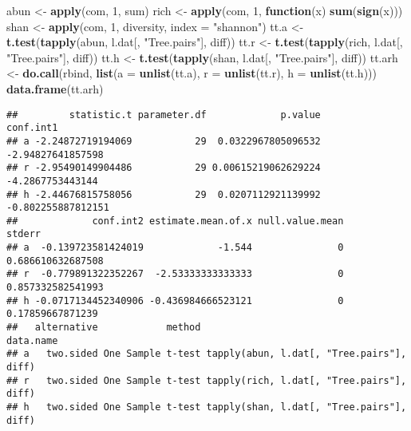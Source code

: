 \documentclass[]{article}
\newenvironment{Shaded}{\begin{snugshade}}{\end{snugshade}}
\newcommand{\KeywordTok}[1]{\textcolor[rgb]{0.13,0.29,0.53}{\textbf{#1}}}
\newcommand{\DataTypeTok}[1]{\textcolor[rgb]{0.13,0.29,0.53}{#1}}
\newcommand{\DecValTok}[1]{\textcolor[rgb]{0.00,0.00,0.81}{#1}}
\newcommand{\StringTok}[1]{\textcolor[rgb]{0.31,0.60,0.02}{#1}}
\newcommand{\ControlFlowTok}[1]{\textcolor[rgb]{0.13,0.29,0.53}{\textbf{#1}}}
\newcommand{\NormalTok}[1]{#1}
\begin{document}
\begin{Shaded}
\begin{Highlighting}[]
\NormalTok{abun <-}\StringTok{ }\KeywordTok{apply}\NormalTok{(com, }\DecValTok{1}\NormalTok{, sum)}
\NormalTok{rich <-}\StringTok{ }\KeywordTok{apply}\NormalTok{(com, }\DecValTok{1}\NormalTok{, }\ControlFlowTok{function}\NormalTok{(x) }\KeywordTok{sum}\NormalTok{(}\KeywordTok{sign}\NormalTok{(x)))}
\NormalTok{shan <-}\StringTok{ }\KeywordTok{apply}\NormalTok{(com, }\DecValTok{1}\NormalTok{, diversity, }\DataTypeTok{index =} \StringTok{"shannon"}\NormalTok{)}
\NormalTok{tt.a <-}\StringTok{ }\KeywordTok{t.test}\NormalTok{(}\KeywordTok{tapply}\NormalTok{(abun, l.dat[, }\StringTok{"Tree.pairs"}\NormalTok{], diff))}
\NormalTok{tt.r <-}\StringTok{ }\KeywordTok{t.test}\NormalTok{(}\KeywordTok{tapply}\NormalTok{(rich, l.dat[, }\StringTok{"Tree.pairs"}\NormalTok{], diff))}
\NormalTok{tt.h <-}\StringTok{ }\KeywordTok{t.test}\NormalTok{(}\KeywordTok{tapply}\NormalTok{(shan, l.dat[, }\StringTok{"Tree.pairs"}\NormalTok{], diff))}
\NormalTok{tt.arh <-}\StringTok{ }\KeywordTok{do.call}\NormalTok{(rbind, }
                  \KeywordTok{list}\NormalTok{(}\DataTypeTok{a =} \KeywordTok{unlist}\NormalTok{(tt.a), }\DataTypeTok{r =} \KeywordTok{unlist}\NormalTok{(tt.r), }\DataTypeTok{h =} \KeywordTok{unlist}\NormalTok{(tt.h)))}
\KeywordTok{data.frame}\NormalTok{(tt.arh)}
\end{Highlighting}
\end{Shaded}

\begin{verbatim}
##         statistic.t parameter.df             p.value          conf.int1
## a -2.24872719194069           29  0.0322967805096532  -2.94827641857598
## r -2.95490149904486           29 0.00615219062629224   -4.2867753443144
## h -2.44676815758056           29  0.0207112921139992 -0.802255887812151
##             conf.int2 estimate.mean.of.x null.value.mean            stderr
## a  -0.139723581424019             -1.544               0 0.686610632687508
## r  -0.779891322352267  -2.53333333333333               0 0.857332582541993
## h -0.0717134452340906 -0.436984666523121               0  0.17859667871239
##   alternative            method                                 data.name
## a   two.sided One Sample t-test tapply(abun, l.dat[, "Tree.pairs"], diff)
## r   two.sided One Sample t-test tapply(rich, l.dat[, "Tree.pairs"], diff)
## h   two.sided One Sample t-test tapply(shan, l.dat[, "Tree.pairs"], diff)
\end{verbatim}
\end{document}
